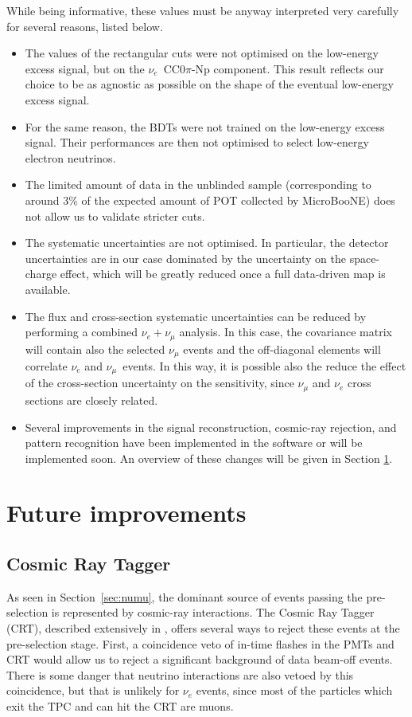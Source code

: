 While being informative, these values must be anyway interpreted very carefully for several reasons, listed below.
\begin{itemize}
    \item The values of the rectangular cuts were not optimised on the low-energy excess signal, but on the $\nu_e$~CC0$\pi$-Np component. This result reflects our choice to be as agnostic as possible on the shape of the eventual low-energy excess signal.
    \item For the same reason, the BDTs were not trained on the low-energy excess signal. Their performances are then not optimised to select low-energy electron neutrinos.
    \item The limited amount of data in the unblinded sample (corresponding to around 3\% of the expected amount of POT collected by MicroBooNE) does not allow us to validate stricter cuts.
    \item The systematic uncertainties are not optimised. In particular, the detector uncertainties are in our case dominated by the uncertainty on the space-charge effect, which will be greatly reduced once a full data-driven map is available.
    \item The flux and cross-section systematic uncertainties can be reduced by performing a combined $\nu_e+\nu_{\mu}$ analysis. In this case, the covariance matrix will contain also the selected $\nu_{\mu}$ events and the off-diagonal elements will correlate $\nu_e$ and $\nu_{\mu}$~events. In this way, it is possible also the reduce the effect of the cross-section uncertainty on the sensitivity, since $\nu_{\mu}$ and $\nu_e$ cross sections are closely related.
    \item Several improvements in the signal reconstruction, cosmic-ray rejection, and pattern recognition have been implemented in the software or will be implemented soon. An overview of these changes will be given in Section \ref{sec:improvements}.
\end{itemize}

\section{Future improvements}\label{sec:improvements}
\subsection*{Cosmic Ray Tagger}
As seen in Section~\ref{sec:numu}, the dominant source of events passing the pre-selection is represented by cosmic-ray interactions.  The Cosmic Ray Tagger (CRT), described extensively in \cite{Auger:2016tjc}, offers several ways to reject these events at the pre-selection stage. First, a coincidence veto of in-time flashes in the PMTs and CRT would allow us to reject a significant background of data beam-off events.  There is some danger that neutrino interactions are also vetoed by this coincidence, but that is unlikely for $\nu_{e}$ events, since most of the particles which exit the TPC and can hit the CRT are muons.

